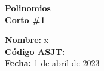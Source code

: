 \begin{center} \textbf
{
    \Large Polinomios \\ \vspace{2mm}Corto \#1
}
\end{center}

\begin{multicols}{1}
{
    \textbf{Nombre:} x\\
    \textbf{Código ASJT:}\\
    \textbf{Fecha:} 1 de abril de 2023
}
\end{multicols}

\thispagestyle{first-page-style}